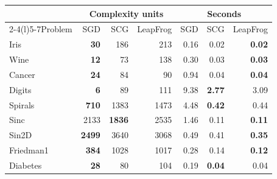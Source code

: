 \begin{tabular}{@{}l rrr rrr@{}}
\toprule
& \multicolumn{3}{c}{Complexity units} & \multicolumn{3}{c}{Seconds} \\\cmidrule(lr){2-4}\cmidrule(l){5-7}Problem & SGD & SCG & LeapFrog & SGD & SCG & LeapFrog \\
\midrule
Iris & \textbf{30} & 186 & 213 & 0.16 & 0.02 & \textbf{0.02} \\
Wine & \textbf{12} & 73 & 138 & 0.30 & 0.03 & \textbf{0.03} \\
Cancer & \textbf{24} & 84 & 90 & 0.94 & 0.04 & \textbf{0.04} \\
Digits & \textbf{6} & 89 & 111 & 9.38 & \textbf{2.77} & 3.09 \\
Spirals & \textbf{710} & 1383 & 1473 & 4.48 & \textbf{0.42} & 0.44 \\
Sinc & 2133 & \textbf{1836} & 2535 & 1.46 & 0.11 & \textbf{0.11} \\
Sin2D & \textbf{2499} & 3640 & 3068 & 0.49 & 0.41 & \textbf{0.35} \\
Friedman1 & \textbf{384} & 1028 & 1017 & 0.28 & 0.14 & \textbf{0.12} \\
Diabetes & \textbf{28} & 80 & 104 & 0.19 & \textbf{0.04} & 0.04 \\
\bottomrule
\end{tabular}
